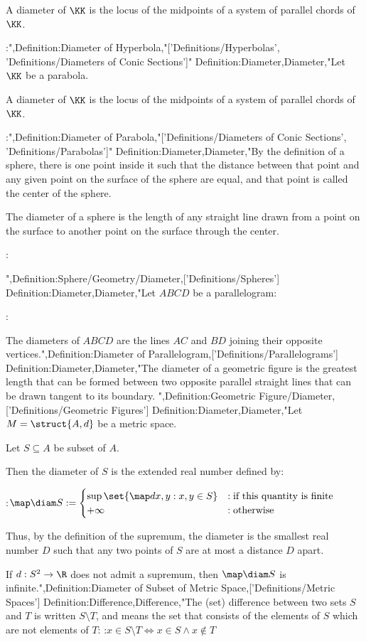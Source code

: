 A diameter of $\KK$ is the locus of the midpoints of a system of parallel chords of $\KK$.


:",Definition:Diameter of Hyperbola,"['Definitions/Hyperbolas', 'Definitions/Diameters of Conic Sections']"
Definition:Diameter,Diameter,"Let $\KK$ be a parabola.

A diameter of $\KK$ is the locus of the midpoints of a system of parallel chords of $\KK$.


:",Definition:Diameter of Parabola,"['Definitions/Diameters of Conic Sections', 'Definitions/Parabolas']"
Definition:Diameter,Diameter,"By the definition of a sphere, there is one point inside it such that the distance between that point and any given point on the surface of the sphere are equal, and that point is called the center of the sphere.


The diameter of a sphere is the length of any straight line drawn from a point on the surface to another point on the surface through the center.



:

",Definition:Sphere/Geometry/Diameter,['Definitions/Spheres']
Definition:Diameter,Diameter,"Let $ABCD$ be a parallelogram:

:

The diameters of $ABCD$ are the lines $AC$ and $BD$ joining their opposite vertices.",Definition:Diameter of Parallelogram,['Definitions/Parallelograms']
Definition:Diameter,Diameter,"The diameter of a geometric figure is the greatest length that can be formed between two opposite parallel straight lines that can be drawn tangent to its boundary.
",Definition:Geometric Figure/Diameter,['Definitions/Geometric Figures']
Definition:Diameter,Diameter,"Let $M = \struct {A, d}$ be a metric space.

Let $S \subseteq A$ be subset of $A$.


Then the diameter of $S$ is the extended real number defined by:

:$\map \diam S := \begin {cases} \sup \set {\map d {x, y}: x, y \in S} & : \text {if this quantity is finite} \\ + \infty & : \text {otherwise} \end {cases}$


Thus, by the definition of the supremum, the diameter is the smallest real number $D$ such that any two points of $S$ are at most a distance $D$ apart.

If $d: S^2 \to \R$ does not admit a supremum, then $\map \diam S$ is infinite.",Definition:Diameter of Subset of Metric Space,['Definitions/Metric Spaces']
Definition:Difference,Difference,"The (set) difference between two sets $S$ and $T$ is written $S \setminus T$, and means the set that consists of the elements of $S$ which are not elements of $T$:
:$x \in S \setminus T \iff x \in S \land x \notin T$


